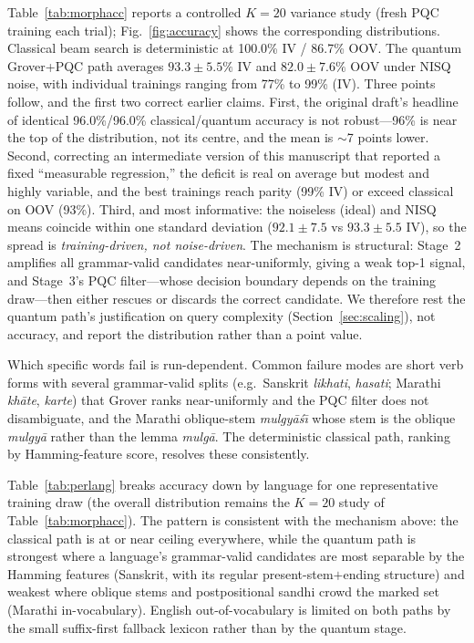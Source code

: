 \documentclass[journal]{IEEEtran}
\begin{document}
Table~\ref{tab:morphacc} reports a controlled $K{=}20$ variance study (fresh PQC
training each trial); Fig.~\ref{fig:accuracy} shows the corresponding
distributions. Classical beam search is deterministic at 100.0\% IV /
86.7\% OOV. The quantum Grover+PQC path averages $93.3\pm5.5\%$ IV and
$82.0\pm7.6\%$ OOV under NISQ noise, with individual trainings ranging from
77\% to 99\% (IV). Three points follow, and the first two correct earlier claims.
First, the original draft's headline of identical 96.0\%/96.0\% classical/quantum
accuracy is not robust---96\% is near the top of the distribution, not its centre,
and the mean is $\sim$7 points lower. Second, correcting an intermediate version
of this manuscript that reported a fixed ``measurable regression,'' the deficit is
real on average but modest and highly variable, and the best trainings reach
parity (99\% IV) or exceed classical on OOV (93\%). Third, and most informative:
the noiseless (ideal) and NISQ means coincide within one standard deviation
($92.1\pm7.5$ vs $93.3\pm5.5$ IV), so the spread is \emph{training-driven, not
noise-driven}. The mechanism is structural: Stage~2 amplifies all grammar-valid
candidates near-uniformly, giving a weak top-1 signal, and Stage~3's PQC
filter---whose decision boundary depends on the training draw---then either
rescues or discards the correct candidate. We therefore rest the quantum path's
justification on query complexity (Section~\ref{sec:scaling}), not accuracy, and
report the distribution rather than a point value.

Which specific words fail is run-dependent. Common failure modes are short verb
forms with several grammar-valid splits (e.g.\ Sanskrit \emph{likhati},
\emph{hasati}; Marathi \emph{kh\={a}te}, \emph{karte}) that Grover ranks
near-uniformly and the PQC filter does not disambiguate, and the Marathi
oblique-stem \emph{mulgy\={a}\'{s}\={\i}} whose stem is the oblique
\emph{mulgy\={a}} rather than the lemma \emph{mulg\={a}}. The deterministic
classical path, ranking by Hamming-feature score, resolves these consistently.

Table~\ref{tab:perlang} breaks accuracy down by language for one representative
training draw (the overall distribution remains the $K{=}20$ study of
Table~\ref{tab:morphacc}). The pattern is consistent with the mechanism above:
the classical path is at or near ceiling everywhere, while the quantum path is
strongest where a language's grammar-valid candidates are most separable by the
Hamming features (Sanskrit, with its regular present-stem$+$ending structure) and
weakest where oblique stems and postpositional sandhi crowd the marked set
(Marathi in-vocabulary). English out-of-vocabulary is limited on both paths by
the small suffix-first fallback lexicon rather than by the quantum stage.
\end{document}
